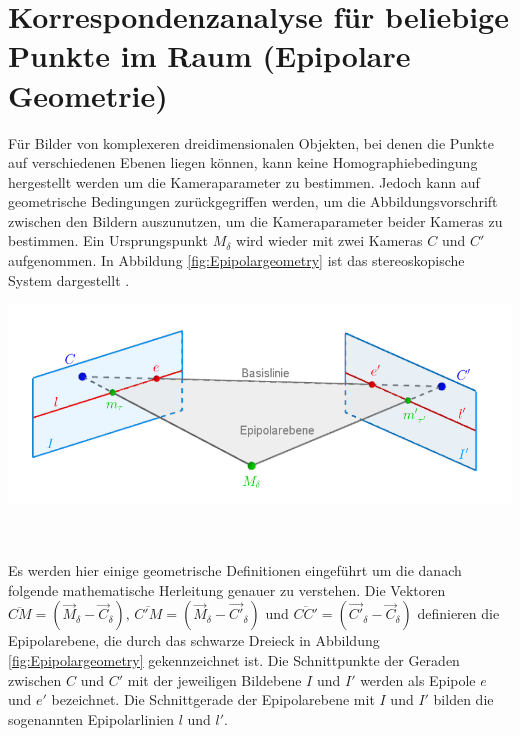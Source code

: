\section{Korrespondenzanalyse für beliebige Punkte im Raum (Epipolare Geometrie)}

Für Bilder von komplexeren dreidimensionalen Objekten, bei denen die Punkte auf verschiedenen Ebenen liegen können, kann keine Homographiebedingung hergestellt werden um die Kameraparameter zu bestimmen. Jedoch kann auf geometrische Bedingungen zurückgegriffen werden, um die Abbildungsvorschrift zwischen den Bildern auszunutzen, um die Kameraparameter beider Kameras zu bestimmen. Ein Ursprungspunkt $M_\delta$ wird wieder mit zwei Kameras $C$ und $C'$ aufgenommen. In Abbildung \ref{fig:Epipolargeometry} ist das stereoskopische System dargestellt . 


\begin{minipage}{\linewidth}
	\centering
	\includegraphics[width=.8\linewidth]{images/EpipolarGeoemtrieGrafik_beschriftet.png}
	\label{fig:Epipolargeometry}
\end{minipage}\\ \\

Es werden hier einige geometrische Definitionen eingeführt um die danach folgende mathematische Herleitung genauer zu verstehen. Die Vektoren $\overline{CM} = (\vec{M}_\delta - \vec{C}_\delta),\, \overline{C'M} = (\vec{M}_\delta - \vec{C'}_\delta)$ und $\overline{CC'} = (\vec{C'}_\delta - \vec{C}_\delta)$ definieren die Epipolarebene, die durch das schwarze Dreieck in Abbildung \ref{fig:Epipolargeometry} gekennzeichnet ist. Die Schnittpunkte der Geraden zwischen $C$ und $C'$ mit der jeweiligen Bildebene $I$ und $I'$ werden als Epipole $e$ und $e'$ bezeichnet. Die Schnittgerade der Epipolarebene mit $I$ und $I'$ bilden die sogenannten Epipolarlinien $l$ und $l'$\cite{HZ,Zhang2014,ZZPaper,phdTwoView}.\\%

